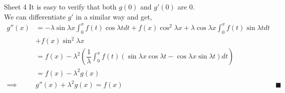 \documentclass[handout, aspectratio=169]{beamer}
\begin{document}
\begin{frame}{Sheet 4}
	It is easy to verify that both $g(0)$ and $g'(0)$ are 0.\\
	We can differentiate $g'$ in a similar way and get,
	\begin{align*}
		g''(x) &= -\lambda\sin\lambda x\int_{0}^{x} f(t)\cos \lambda t dt + f(x)\cos^2\lambda x + \lambda \cos \lambda x \int_{0}^{x} f(t)\sin \lambda t dt \\
		& + f(x)\sin^2 \lambda x\\
		&= f(x) - \lambda^2\left(\dfrac{1}{\lambda}\int_{0}^{x} f(t) \left(\sin \lambda x\cos \lambda t - \cos \lambda x \sin \lambda t\right) dt\right)\\
		&= f(x) - \lambda^2g(x)\\
		\implies & g''(x) + \lambda^2g(x) = f(x) & \blacksquare
	\end{align*}
\end{frame}
\end{document}
